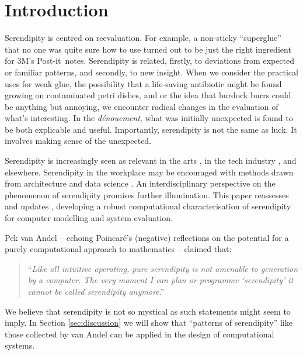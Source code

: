 \section{Introduction}

Serendipity is centred on reevaluation.  For example, a
non-sticky ``superglue'' that no one was quite sure how to use turned
out to be just the right ingredient for 3M's
Post-it\texttrademark\ notes.
%
Serendipity is related, firstly, to deviations from expected or
familiar patterns, and secondly, to new insight.
%
When we consider the practical uses for weak glue, the possibility
that a life-saving antibiotic might be found growing on contaminated
petri dishes, and or the idea that burdock burrs could be anything but
annoying, we encounter radical changes in the evaluation of what's
interesting.  In the \emph{d\'enouement}, what was initially
unexpected is found to be both explicable and useful.  Importantly,
serendipity is not the same as luck.  It involves making sense of
the unexpected.

Serendipity is increasingly seen as relevant in the arts
\cite{mckay-serendipity}, in the tech industry \cite{rao2015breaking}, and elsewhere.  Serendipity in the workplace may be encouraged with methods drawn from architecture and data science \cite{kakko2009homo,engineering-serendipity}.
An interdisciplinary perspective on the phenomenon of serendipity promises further illumination.
This paper reassesses and updates , developing a robust computational characterisation of serendipity for computer modelling and system evaluation.

Pek van Andel \citeyear{van1994anatomy} -- echoing Poincar\'e's
\citeyear{poincare1910creation} (negative) reflections on the potential
for a purely computational approach to mathematics -- claimed that:
\begin{quote}
``\emph{Like all intuitive operating, pure serendipity is not amenable
    to generation by a computer.  The very moment I can plan or
    programme `serendipity' it cannot be called serendipity
    anymore}.'' \cite{van1994anatomy}
\end{quote}
We believe that serendipity is not so mystical as such statements
might seem to imply.  In Section \ref{sec:discussion} we will
show that ``patterns of serendipity'' like those collected by van Andel
can be applied in the design of computational systems.

